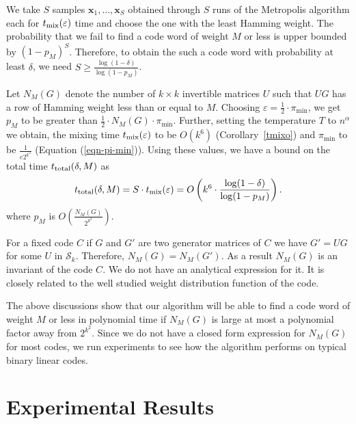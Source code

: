 \documentclass{sig-alternate-2013}
\begin{document}
We take $S$ samples $\mathbf{x}_1,\ldots, \mathbf{x}_S$ obtained
through $S$ runs of the Metropolis algorithm each for $t_{\mathrm{mix}}(\varepsilon)$ time and
choose the one with the least Hamming weight. The probability that we
fail to find a code word of weight $M$ or less is upper bounded by
$(1-p_M)^S$. Therefore, to obtain the such a code word with
probability at least $\delta$, we need $S \geq \frac{\log(1 -
  \delta)}{\log(1 - p_M)}$.

Let $N_M(G)$ denote the number of $k \times k$ invertible matrices $U$
such that $UG$ has a row of Hamming weight less than or equal to $M$.
Choosing $\varepsilon = \frac{1}{2} \cdot \pi_{\min}$, we get $p_M$ to
be greater than $\frac{1}{2} \cdot N_M(G) \cdot \pi_{\min}$. Further,
setting the temperature $T$ to $n^\alpha$ we obtain, the mixing time
$t_{\mathrm{mix}}(\varepsilon)$ to be $O(k^6)$ (Corollary~\ref{tmixo}) and $\pi_{\min}$ to be
$\frac{1}{e2^{k^2}}$ (Equation (\ref{eqn-pi-min})). Using these values,
we have a bound on the total time $t_{\mathrm{total}}(\delta,M)$ as
\[
t_{\mathrm{total}}(\delta,M) = S \cdot t_{\mathrm{mix}}(\varepsilon) = O\left( k^6 \cdot \frac{\log(1 - \delta)}{\log(1
  - p_M)}\right).
\]
where $p_M$ is $O\left(\frac{N_M(G)}{2^{k^2}}\right)$.

For a fixed code $C$ if $G$ and $G'$ are two generator matrices of $C$
we have $G' = U G$ for some $U$ in $\mathcal{S}_k$. Therefore, $N_M(G)
= N_M(G')$. As a result $N_M(G)$ is an invariant of the code $C$. We
do not have an analytical expression for it. It is closely related to
the well studied weight distribution function of the code.

The above discussions show that our algorithm will be able to find a
code word of weight $M$ or less in polynomial time if $N_M(G)$ is
large at most a polynomial factor away from $2^{k^2}$. Since we do not
have a closed form expression for $N_M(G)$ for most codes, we run
experiments to see how the algorithm performs on typical binary linear
codes.

\section{Experimental Results} \label{section-experiments}
\end{document}
